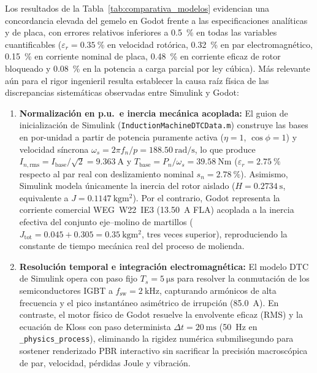 Los resultados de la Tabla~\ref{tab:comparativa_modelos} evidencian una concordancia elevada del gemelo en Godot frente a las especificaciones analíticas y de placa, con errores relativos inferiores a \qty{0.5}{\percent} en todas las variables cuantificables ($\varepsilon_r = \qty{0.35}{\percent}$ en velocidad rotórica, \qty{0.32}{\percent} en par electromagnético, \qty{0.15}{\percent} en corriente nominal de placa, \qty{0.48}{\percent} en corriente eficaz de rotor bloqueado y \qty{0.08}{\percent} en la potencia a carga parcial por ley cúbica). Más relevante aún para el rigor ingenieril resulta establecer la causa raíz física de las discrepancias sistemáticas observadas entre Simulink y Godot:

\begin{enumerate}\setlength{\itemsep}{2pt}\setlength{\topsep}{2pt}
\item \textbf{Normalización en p.u.\ e inercia mecánica acoplada:} El guion de inicialización de Simulink (\texttt{InductionMachineDTCData.m}) construye las bases en por-unidad a partir de potencia puramente activa ($\eta=1$, $\cos\phi=1$) y velocidad síncrona $\omega_s = 2\pi f_n/p = \qty{188.50}{\radian\per\second}$, lo que produce $I_{n,\text{rms}} = I_{\text{base}}/\sqrt{2} = \qty{9.363}{\ampere}$ y $T_{\text{base}} = P_n/\omega_s = \qty{39.58}{\newton\meter}$ ($\varepsilon_r = \qty{2.75}{\percent}$ respecto al par real con deslizamiento nominal $s_n=\qty{2.78}{\percent}$). Asimismo, Simulink modela únicamente la inercia del rotor aislado ($H=\qty{0.2734}{\second}$, equivalente a $J=\qty{0.1147}{\kilogram\meter\squared}$). Por el contrario, Godot representa la corriente comercial WEG~W22~IE3 (\qty{13.50}{\ampere} FLA) acoplada a la inercia efectiva del conjunto eje--molino de martillos ($J_{\text{tot}} = 0.045 + 0.305 = \qty{0.35}{\kilogram\meter\squared}$, tres veces superior), reproduciendo la constante de tiempo mecánica real del proceso de molienda.
\item \textbf{Resolución temporal e integración electromagnética:} El modelo DTC de Simulink opera con paso fijo $T_s=\qty{5}{\micro\second}$ para resolver la conmutación de los semiconductores IGBT a $f_{\text{sw}}=\qty{2}{\kilo\hertz}$, capturando armónicos de alta frecuencia y el pico instantáneo asimétrico de irrupción (\qty{85.0}{\ampere}). En contraste, el motor físico de Godot resuelve la envolvente eficaz (RMS) y la ecuación de Kloss con paso determinista $\Delta t=\qty{20}{\milli\second}$ (\qty{50}{\hertz} en \texttt{\_physics\_process}), eliminando la rigidez numérica submilisegundo para sostener renderizado PBR interactivo sin sacrificar la precisión macroscópica de par, velocidad, pérdidas Joule y vibración.

\end{enumerate}
